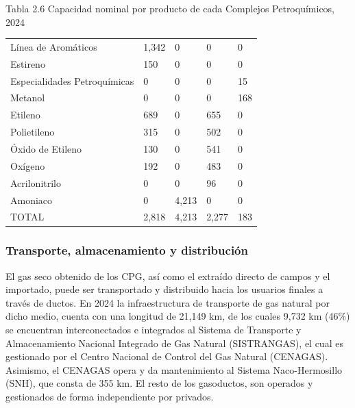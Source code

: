 \documentclass{sener2025}
\begin{document}
\begin{tabladoradoCorto}
  \caption{Tabla 2.6 Capacidad nominal por producto de cada Complejos Petroquímicos, 2024}
  \label{tab:tabla_2_6_capacidad_nominal_po}
  \begin{tabularx}{\textwidth}{Vvvvv}
    \toprule
      &  &  &  &  \\
    \midrule
    Línea de Aromáticos & 1,342 & 0 & 0 & 0 \\
    Estireno & 150 & 0 & 0 & 0 \\
    Especialidades Petroquímicas & 0 & 0 & 0 & 15 \\
    Metanol & 0 & 0 & 0 & 168 \\
    Etileno & 689 & 0 & 655 & 0 \\
    Polietileno & 315 & 0 & 502 & 0 \\
    Óxido de Etileno & 130 & 0 & 541 & 0 \\
    Oxígeno & 192 & 0 & 483 & 0 \\
    Acrilonitrilo & 0 & 0 & 96 & 0 \\
    Amoniaco & 0 & 4,213 & 0 & 0 \\
    TOTAL & 2,818 & 4,213 & 2,277 & 183 \\
    \bottomrule
  \end{tabularx}
\end{tabladoradoCorto}
\vspace{-4pt}



\subsubsection{Transporte, almacenamiento y distribución}

El gas seco obtenido de los CPG, así como el extraído directo de campos y el importado, puede ser transportado y distribuido hacia los usuarios finales a través de ductos. En 2024 la infraestructura de transporte de gas natural por dicho medio, cuenta con una longitud de 21,149 km, de los cuales 9,732 km (46\%) se encuentran interconectados e integrados al Sistema de Transporte y Almacenamiento Nacional Integrado de Gas Natural (SISTRANGAS), el cual es gestionado por el Centro Nacional de Control del Gas Natural (CENAGAS). Asimismo, el CENAGAS opera y da mantenimiento al Sistema Naco-Hermosillo (SNH), que consta de 355 km. El resto de los gasoductos, son operados y gestionados de forma independiente por privados.
\end{document}

